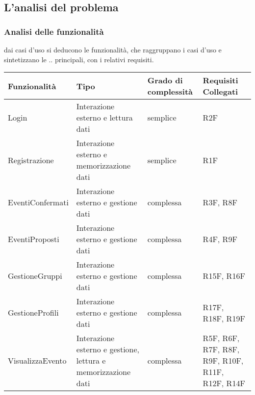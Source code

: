 \subsection{L’analisi del problema}

\subsubsection{Analisi delle funzionalità}
dai casi d'uso si deducono le funzionalità, che raggruppano i casi d'uso e sintetizzano le .. principali, con i relativi requisiti.

\begin{table}[htbp]
    \centering
    \begin{tabular} {|P{3.8cm}|P{4.5cm}|P{2.5cm}|P{4cm}|}
        \hline
        \textbf{Funzionalità} & \textbf{Tipo}                                                 & \textbf{Grado di complessità} & \textbf{Requisiti Collegati}                    \\
        \hline
        Login                 & Interazione esterno e lettura dati                            & semplice                      & R2F                                             \\
        \hline
        Registrazione         & Interazione esterno e memorizzazione dati                     & semplice                      & R1F                                             \\
        \hline
        EventiConfermati      & Interazione esterno e gestione dati                           & complessa                     & R3F, R8F                                        \\
        \hline
        EventiProposti        & Interazione esterno e gestione dati                           & complessa                     & R4F, R9F                                        \\
        \hline
        GestioneGruppi        & Interazione esterno e gestione dati                           & complessa                     & R15F, R16F                                      \\
        \hline
        GestioneProfili       & Interazione esterno e gestione dati                           & complessa                     & R17F, R18F, R19F                                \\
        \hline
        VisualizzaEvento      & Interazione esterno e gestione, lettura e memorizzazione dati & complessa                     & R5F, R6F, R7F, R8F, R9F, R10F, R11F, R12F, R14F \\

\end{tabular}
\end{table}
